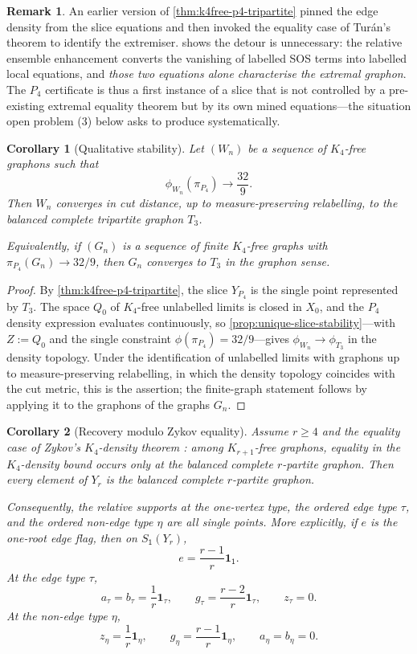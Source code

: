 \documentclass[11pt]{article}
\newtheorem{corollary}[corollary]{Corollary}
\theoremstyle{definition}
\newtheorem{remark}[remark]{Remark}
\newcommand{\one}{\mathbf 1}
\newcommand{\vtype}{\mathsf{1}}
\begin{document}
\begin{remark}
An earlier version of \cref{thm:k4free-p4-tripartite} pinned the edge density from the
slice equations and then invoked the equality case of Tur\'an's theorem to identify the
extremiser.   shows the detour is unnecessary: the relative
ensemble enhancement converts the vanishing of labelled SOS terms into labelled local
equations, and \emph{those two equations alone characterise the extremal graphon}.  The
$P_4$ certificate is thus a first instance of a slice that is not controlled by a
pre-existing extremal equality theorem but by its own mined equations---the situation
open problem (3) below asks to produce systematically.
\end{remark}

\begin{corollary}[Qualitative stability]\label{cor:k4free-p4-qualitative-stability}
Let $(W_n)$ be a sequence of $K_4$-free graphons such that
\[
  \phi_{W_n}(\pi_{P_4})\longrightarrow \frac{32}{9}.
\]
Then $W_n$ converges in cut distance, up to measure-preserving relabelling, to the
balanced complete tripartite graphon $T_3$.

Equivalently, if $(G_n)$ is a sequence of finite $K_4$-free graphs with
$\pi_{P_4}(G_n)\to32/9$, then $G_n$ converges to $T_3$ in the graphon sense.
\end{corollary}

\begin{proof}
By \cref{thm:k4free-p4-tripartite}, the slice $Y_{P_4}$ is the single point represented
by $T_3$.  The space $Q_0$ of $K_4$-free unlabelled limits is closed in $X_0$, and the
$P_4$ density expression evaluates continuously, so
\cref{prop:unique-slice-stability}---with $Z:=Q_0$ and the single constraint
$\phi(\pi_{P_4})=32/9$---gives $\phi_{W_n}\to\phi_{T_3}$ in the density topology.  Under
the identification of unlabelled limits with graphons up to measure-preserving
relabelling, in which the density topology coincides with the cut metric, this is the
assertion; the finite-graph statement follows by applying it to the graphons of the
graphs $G_n$.
\end{proof}

\begin{corollary}[Recovery modulo Zykov equality]
\label{cor:parametric-p4-turan-recovery}
Assume $r\ge4$ and the equality case of Zykov's $K_4$-density theorem
\cite{Zykov1949}: among $K_{r+1}$-free graphons, equality in the $K_4$-density bound
occurs only at the balanced complete $r$-partite graphon.  Then every element of $Y_r$
is the balanced complete $r$-partite graphon.

Consequently, the relative supports at the one-vertex type, the ordered edge type
$\tau$, and the ordered non-edge type $\eta$ are all single points.  More explicitly, if
$e$ is the one-root edge flag, then on $S_{\vtype}(Y_r)$,
\[
  e=\frac{r-1}{r}\one_{\vtype} .
\]
At the edge type $\tau$,
\[
  a_\tau=b_\tau=\frac1r\one_\tau,
  \qquad
  g_\tau=\frac{r-2}{r}\one_\tau,
  \qquad
  z_\tau=0 .
\]
At the non-edge type $\eta$,
\[
  z_\eta=\frac1r\one_\eta,
  \qquad
  g_\eta=\frac{r-1}{r}\one_\eta,
  \qquad
  a_\eta=b_\eta=0 .
\]
\end{corollary}
\end{document}
